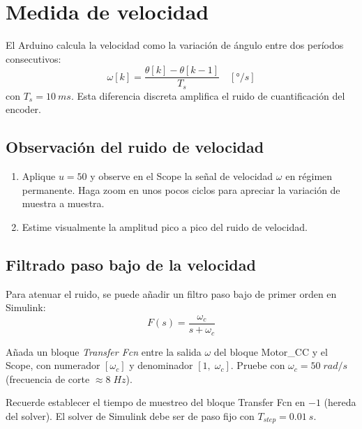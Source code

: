 \documentclass[12pt,a4paper]{article}
\begin{document}
\section{Medida de velocidad}

El Arduino calcula la velocidad como la variación de ángulo entre dos períodos consecutivos:
\begin{equation}
  \omega[k] = \frac{\theta[k] - \theta[k-1]}{T_s} \quad [\si{\degree/s}]
  \label{eq:vel_discreta}
\end{equation}
con $T_s = \SI{10}{ms}$. Esta diferencia discreta amplifica el ruido de cuantificación del encoder.

\subsection{Observación del ruido de velocidad}

\begin{enumerate}
  \item Aplique $u = 50$ y observe en el Scope la señal de velocidad $\omega$ en
        régimen permanente. Haga zoom en unos pocos ciclos para apreciar la
        variación de muestra a muestra.
  \item Estime visualmente la amplitud pico a pico del ruido de velocidad.
\end{enumerate}

\subsection{Filtrado paso bajo de la velocidad}

Para atenuar el ruido, se puede añadir un filtro paso bajo de primer orden en Simulink:
\begin{equation}
  F(s) = \frac{\omega_c}{s + \omega_c}
  \label{eq:filtro}
\end{equation}

Añada un bloque \emph{Transfer Fcn} entre la salida $\omega$ del bloque Motor\_CC
y el Scope, con numerador $[\omega_c]$ y denominador $[1,\;\omega_c]$.
Pruebe con $\omega_c = 50\;\si{rad/s}$ (frecuencia de corte $\approx 8\;\si{Hz}$).

\begin{notabox}
  Recuerde establecer el tiempo de muestreo del bloque Transfer Fcn en $-1$
  (hereda del solver). El solver de Simulink debe ser de paso fijo con
  $T_{step} = \SI{0.01}{s}$.
\end{notabox}
\end{document}
